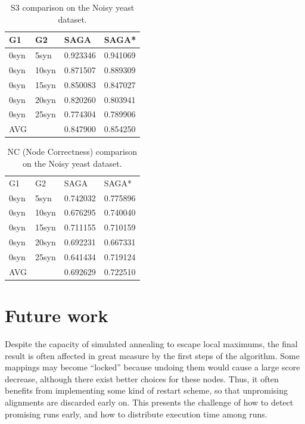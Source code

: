 \documentclass[]{article}
\begin{document}
\begin{table}
\centering
\caption{S3 comparison on the Noisy yeast dataset.}
\label{tab:s32}
\begin{tabular}{llll}
G1   & G2    & SAGA  & SAGA* \\ \hline
0syn & 5syn  & 0.923346 & 0.941069     \\
0syn & 10syn & 0.871507 & 0.889309     \\
0syn & 15syn & 0.850083 & 0.847027     \\
0syn & 20syn & 0.820260 & 0.803941     \\
0syn & 25syn & 0.774304 & 0.789906     \\
AVG  &       & 0.847900 & 0.854250    
\end{tabular}
\end{table}

 \begin{table}
 \centering
 \caption{NC (Node Correctness) comparison on the Noisy yeast dataset.}
 \label{tab:nc}
 \begin{tabular}{llll}
 G1   & G2    & SAGA  & SAGA* \\
 0syn & 5syn  & 0.742032 & 0.775896 \\
 0syn & 10syn & 0.676295 & 0.740040 \\
 0syn & 15syn & 0.711155 & 0.710159 \\
 0syn & 20syn & 0.692231 & 0.667331 \\
 0syn & 25syn & 0.641434 & 0.719124 \\
 AVG  &       & 0.692629 & 0.722510
 \end{tabular}
 \end{table}


\section{Future work}

Despite the capacity of simulated annealing to escape local maximums, the final result is often affected in great measure by the first steps of the algorithm. Some mappings may become ``locked'' because undoing them would cause a large score decrease, although there exist better choices for these nodes. Thus, it often benefits from implementing some kind of restart scheme, so that unpromising alignments are discarded early on. This presents the challenge of how to detect promising runs early, and how to distribute execution time among runs.



\end{document}
